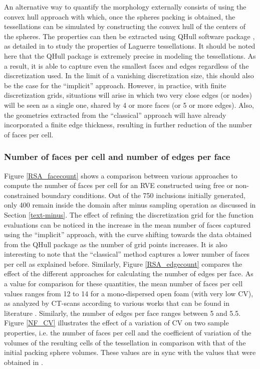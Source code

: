 An alternative way to quantify the morphology externally consists of using the convex hull approach with which, once the spheres packing is obtained, the tessellations can be simulated by constructing the convex hull of the centers of the spheres. The properties can then be extracted using QHull software package \cite{barberQuickhullAlgorithmConvex1996}, as detailed in \cite{redenbachMicrostructureModelsCellular2009} to study the properties of Laguerre tessellations. It should be noted here that the QHull package is extremely precise in modeling the tessellations. As a result, it is able to capture even the smallest faces and edges regardless of the discretization used. In the limit of a vanishing discretization size, this should also be the case for the ``implicit'' approach. However, in practice, with finite discretization grids, situations will arise in which two very close edges (or nodes) will be seen as a single one, shared by 4 or more faces (or 5 or more edges). Also, the geometries extracted from the ``classical'' approach will have already incorporated a finite edge thickness, resulting in further reduction of the number of faces per cell. 

\subsubsection{Number of faces per cell and number of edges per face}
Figure \ref{RSA_facecount} shows a comparison between various approaches to compute the number of faces per cell for an RVE constructed using free or non-constrained boundary conditions. Out of the 750 inclusions initially generated, only 400 remain inside the domain after minus sampling operation as discussed in Section \ref{text-minus}. The effect of refining the discretization grid for the function evaluations can be noticed in the increase in the mean number of faces captured using the ``implicit'' approach, with the curve shifting towards the data obtained from the QHull package as the number of grid points increases. It is also interesting to note that the ``classical'' method captures a lower number of faces per cell as explained before. Similarly, Figure \ref{RSA_edgecount} compares the effect of the different approaches for calculating the number of edges per face. As a value for comparison for these quantities, the mean number of faces per cell values ranges from 12 to 14 for a mono-dispersed 
open foam (with very low CV), as analyzed by CT-scans according to various works that can be found in literature \cite{monnereauTopologySlightlyPolydisperse2001}. Similarly, the number of edges per face ranges between 5 and 5.5. Figure \ref{NF_CV} illustrates the effect of a variation of CV on two sample properties, i.e. the number of faces per cell and the coefficient of variation of the volumes of the resulting cells of the tessellation in comparison with that of the initial packing sphere volumes. These values are in sync with the values that were obtained in \cite{redenbachMicrostructureModelsCellular2009}.

